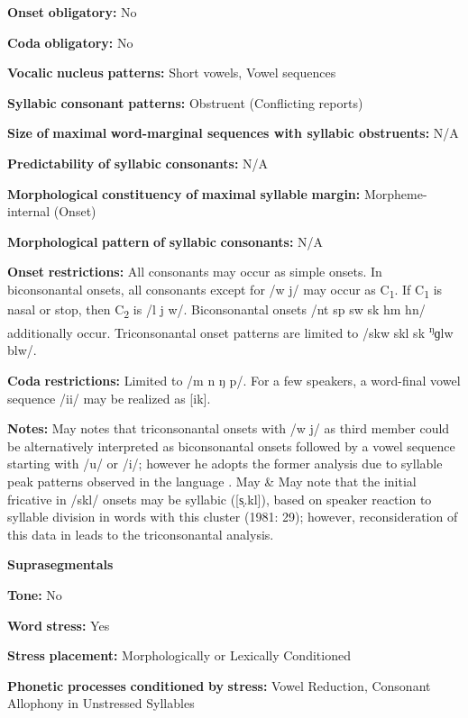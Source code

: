\textbf{Onset} \textbf{obligatory:} No

\textbf{Coda} \textbf{obligatory:} No

\textbf{Vocalic} \textbf{nucleus} \textbf{patterns:} Short vowels, Vowel sequences

\textbf{Syllabic} \textbf{consonant} \textbf{patterns:} Obstruent (Conflicting reports)

\textbf{Size} \textbf{of} \textbf{maximal} \textbf{word{}-marginal sequences with syllabic obstruents:} N/A

\textbf{Predictability} \textbf{of} \textbf{syllabic} \textbf{consonants:} N/A

\textbf{Morphological} \textbf{constituency} \textbf{of} \textbf{maximal} \textbf{syllable} \textbf{margin:} Morpheme-internal (Onset)

\textbf{Morphological} \textbf{pattern} \textbf{of} \textbf{syllabic} \textbf{consonants:} N/A

\textbf{Onset} \textbf{restrictions:} All consonants may occur as simple onsets. In biconsonantal onsets, all consonants except for /w j/ may occur as C\textsubscript{1}. If C\textsubscript{1} is nasal or stop, then C\textsubscript{2} is /l j w/. Biconsonantal onsets /nt sp sw sk hm hn/ additionally occur. Triconsonantal onset patterns are limited to /skw skl sk \textsuperscript{ŋ}ɡlw blw/.

\textbf{Coda} \textbf{restrictions:} Limited to /m n ŋ p/. For a few speakers, a word-final vowel sequence /ii/ may be realized as [ik].

\textbf{Notes:} May notes that triconsonantal onsets with /w j/ as third member could be alternatively interpreted as biconsonantal onsets followed by a vowel sequence starting with /u/ or /i/; however he adopts the former analysis due to syllable peak patterns observed in the language \citep[17-18]{May1997}. May \& May note that the initial fricative in /skl/ onsets may be syllabic ([s̩.kl]), based on speaker reaction to syllable division in words with this cluster (1981: 29); however, reconsideration of this data in \citet{May1997} leads to the triconsonantal analysis.

\textbf{Suprasegmentals}

\textbf{Tone:} No

\textbf{Word} \textbf{stress:} Yes

\textbf{Stress} \textbf{placement:} Morphologically or Lexically Conditioned

\textbf{Phonetic} \textbf{processes} \textbf{conditioned} \textbf{by} \textbf{stress:} Vowel Reduction, Consonant Allophony in Unstressed Syllables

